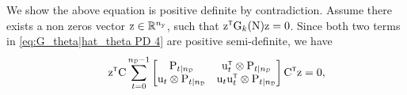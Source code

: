 We show the above equation is positive definite by contradiction. Assume there exists a non zeros vector ${ \mathrm{z} } \in {\mathbb{R}}^{n_{ \mathrm{y} }}$, such that $\vcz^\tr \mxG_k(\mxN) \vcz = 0$. Since both two terms in \eqref{eq:G_theta|hat_theta PD 4} are positive semi-definite, we have
\begin{equation}
\begin{split}
    &\qquad  \vcz^\tr \mxC 
    \sum_{t=0}^{\nD-1}
    \begin{bmatrix}  
    \mxP_{t|\nD} 
    & \vcu_t^\tr \otimes\mxP_{t|\nD}\\
    \vcu_t \otimes \mxP_{t|\nD}
    & \vcu_t \vcu_t^\tr \otimes \mxP_{t|\nD} 
    \end{bmatrix}
    \mxC^\tr \vcz = 0,\\
\end{split}
\end{equation}    
